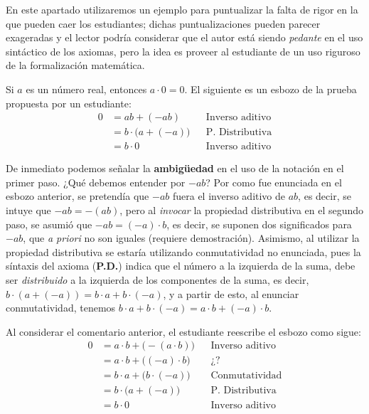 \documentclass[11pt]{article}
\begin{document}
En este apartado utilizaremos un ejemplo para puntualizar la falta de rigor en la que pueden caer los estudiantes; dichas puntualizaciones pueden parecer exageradas y el lector podría considerar que el autor está siendo \textit{pedante} en el uso sintáctico de los axiomas, pero la idea es proveer al estudiante de un uso riguroso de la formalización matemática.

Si $a$ es un número real, entonces $a\cdot 0 = 0$. El siguiente es un esbozo de la prueba propuesta por un estudiante:
\begin{align*}
    0 &= ab+ (-ab) && \text{Inverso aditivo}\\
    &= b \cdot \bigl(a + (-a)\bigr) && \text{P. Distributiva}\\
    &= b \cdot 0 && \text{Inverso aditivo}
\end{align*}

De inmediato podemos señalar la \textbf{ambigüedad} en el uso de la notación en el primer paso. ¿Qué debemos entender por $-ab$? Por como fue enunciada en el esbozo anterior, se pretendía que $-ab$ fuera el inverso aditivo de $ab$, es decir, se intuye que $-ab=-(ab)$, pero al \textit{invocar} la propiedad distributiva en el segundo paso, se asumió que $-ab=(-a)\cdot b$, es decir, se suponen dos significados para $-ab$, que \textit{a priori} no son iguales (requiere demostración). Asimismo, al utilizar la propiedad distributiva se estaría utilizando conmutatividad no enunciada, pues la síntaxis del axioma (\textbf{P.D.}) indica que el número a la izquierda de la suma, debe ser \textit{distribuido} a la izquierda de los componentes de la suma, es decir, $b\cdot (a+(-a))=b\cdot a + b\cdot (-a)$, y a partir de esto, al enunciar conmutatividad, tenemos $b\cdot a + b\cdot (-a)=a\cdot b + (-a)\cdot b$.

Al considerar el comentario anterior, el estudiante reescribe el esbozo como sigue: \begin{align*}
    0 &= a\cdot b + \bigl(-(a\cdot b)\bigr) && \text{Inverso aditivo}\\
    &= a\cdot b + \bigl((-a)\cdot b\bigr) && \text{¿?}\\
    &= b\cdot a + \bigl(b \cdot (-a)\bigr) && \text{Conmutatividad}\\
    &= b\cdot \bigl(a+(-a)\bigr) && \text{P. Distributiva}\\
    &= b\cdot 0 && \text{Inverso aditivo}
\end{align*}
\end{document}
